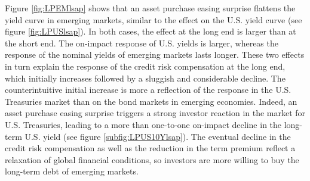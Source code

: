 {Figure \ref{fig:LPEMlsap} shows that an asset purchase easing surprise flattens the yield curve in emerging markets, similar to the effect on the U.S. yield curve (see figure \ref{fig:LPUSlsap}). %
In both cases, the effect at the long end %
is larger than at the short end.
The on-impact response of U.S. yields is larger, whereas the response of the nominal yields of emerging markets lasts longer.
These two effects in turn explain the response of the credit risk compensation at the long end, which %
initially increases followed by a sluggish and considerable decline.
The counterintuitive initial increase %
is more a reflection of the response in the U.S. Treasuries market than on the bond markets in emerging economies.
Indeed, an asset purchase easing surprise triggers a strong investor reaction in the market for U.S. Treasuries, leading to a  more than one-to-one on-impact decline in the long-term U.S. yield (see figure \ref{subfig:LPUS10Ylsap}).
The eventual decline in the credit risk compensation as well as the reduction in the term premium reflect a relaxation of global financial conditions, so investors are more willing to buy the long-term debt of emerging markets. 

}
